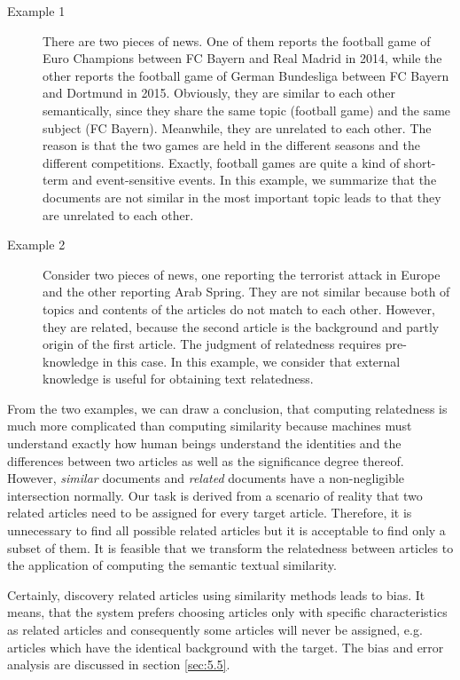 \begin{description}

\item[Example 1] There are two pieces of news. One of them reports the football game of Euro Champions between FC Bayern and Real Madrid in 2014, while the other reports the football game of German Bundesliga between FC Bayern and Dortmund in 2015. Obviously, they are similar to each other semantically, since they share the same topic (football game) and the same subject (FC Bayern). Meanwhile, they are unrelated to each other. The reason is that the two games are held in the different seasons and the different competitions. Exactly, football games are quite a kind of short-term and event-sensitive events. In this example, we summarize that the documents are not similar in the most important topic leads to that they are unrelated to each other.

\item[Example 2] Consider two pieces of news, one reporting the terrorist attack in Europe and the other reporting Arab Spring. They are not similar because both of topics and contents of the articles do not match to each other. However, they are related, because the second article is the background and partly origin of the first article. The judgment of relatedness requires pre-knowledge in this case. In this example, we consider that external knowledge is useful for obtaining text relatedness. 
\end{description}

From the two examples, we can draw a conclusion, that computing relatedness is much more complicated than computing similarity because machines must understand exactly how human beings understand the identities and the differences between two articles as well as the significance degree thereof. However, \textit{similar} documents and \textit{related} documents have a non-negligible intersection normally. Our task is derived from a scenario of reality that two related articles need to be assigned for every target article. Therefore, it is unnecessary to find all possible related articles but it is acceptable to find only a subset of them. It is feasible that we transform the relatedness between articles to the application of computing the semantic textual similarity.

Certainly, discovery related articles using similarity methods leads to bias. It means, that the system prefers choosing articles only with specific characteristics as related articles and consequently some articles will never be assigned, e.g. articles which have the identical background with the target. The bias and error analysis are discussed in section \ref{sec:5.5}.

